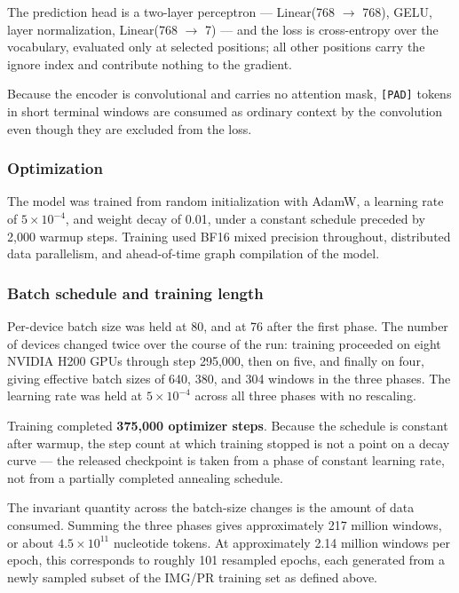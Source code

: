 The prediction head is a two-layer perceptron --- Linear(768 $\rightarrow$
768), GELU, layer normalization, Linear(768 $\rightarrow$ 7) --- and the loss
is cross-entropy over the vocabulary, evaluated only at selected positions;
all other positions carry the ignore index and contribute nothing to the
gradient.

Because the encoder is convolutional and carries no attention mask,
\texttt{[PAD]} tokens in short terminal windows are consumed as ordinary
context by the convolution even though they are excluded from the loss.

\subsubsection*{Optimization}

The model was trained from random initialization with AdamW, a learning rate
of $5 \times 10^{-4}$, and weight decay of 0.01, under a constant schedule
preceded by 2,000 warmup steps. Training used BF16 mixed precision
throughout, distributed data parallelism, and ahead-of-time graph compilation
of the model.

\subsubsection*{Batch schedule and training length}

Per-device batch size was held at 80, and at 76 after the first phase. The
number of devices changed twice over the course of the run: training
proceeded on eight NVIDIA H200 GPUs through step 295,000, then on five, and finally on
four, giving effective batch sizes of 640, 380, and 304 windows in the three
phases. The learning rate was held at $5 \times 10^{-4}$ across all three
phases with no rescaling.

Training completed \textbf{375,000 optimizer steps}. Because the schedule is
constant after warmup, the step count at which training stopped is not a
point on a decay curve --- the released checkpoint is taken from a phase of
constant learning rate, not from a partially completed annealing schedule.

The invariant quantity across the batch-size changes is the amount of data
consumed. Summing the three phases gives approximately 217 million windows,
or about $4.5 \times 10^{11}$ nucleotide tokens. At approximately 2.14
million windows per epoch, this corresponds to roughly 101 resampled epochs,
each generated from a newly sampled subset of the IMG/PR training set as
defined above.

